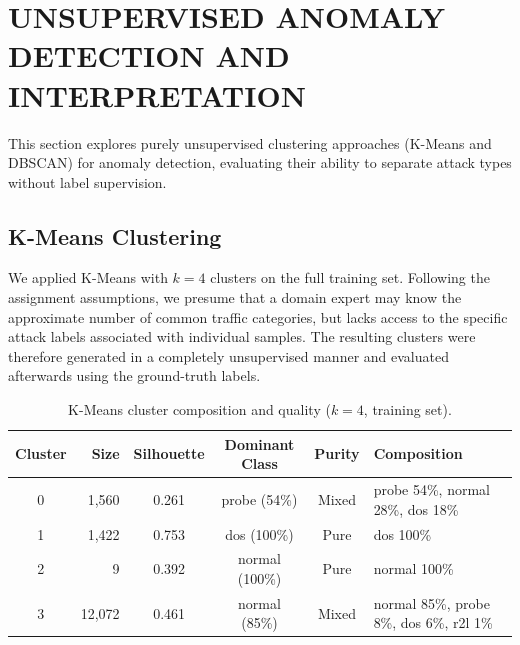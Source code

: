 
\section{UNSUPERVISED ANOMALY DETECTION AND INTERPRETATION} \label{sec:task4}

This section explores purely unsupervised clustering approaches (K-Means and DBSCAN) for anomaly detection, evaluating their ability to separate attack types without label supervision.

\subsection{K-Means Clustering} \label{sec:kmeans}

    We applied K-Means with $k = 4$ clusters on the full training set. 
    Following the assignment assumptions, we presume that a domain expert may know the approximate number of common traffic categories, but lacks access to the specific attack labels associated with individual samples.
    The resulting clusters were therefore generated in a completely unsupervised manner and evaluated afterwards using the ground-truth labels.

    \begin{table}[H]
        \centering
        \begin{tabular}{@{}crcccl@{}}
            \toprule
            \textbf{Cluster} & \textbf{Size} & \textbf{Silhouette} & \textbf{Dominant Class} & \textbf{Purity} & \textbf{Composition} \\
            \midrule
            0 & 1,560  & 0.261 & probe (54\%)   & Mixed & probe 54\%, normal 28\%, dos 18\% \\
            1 & 1,422  & 0.753 & dos (100\%)    & Pure  & dos 100\% \\
            2 & 9      & 0.392 & normal (100\%) & Pure  & normal 100\% \\
            3 & 12,072 & 0.461 & normal (85\%)  & Mixed & normal 85\%, probe 8\%, dos 6\%, r2l 1\% \\
            \bottomrule
        \end{tabular}
        \vspace{0.5em}
        \caption{K-Means cluster composition and quality ($k = 4$, training set).}
        \label{tab:kmeans_clusters}
    \end{table}

